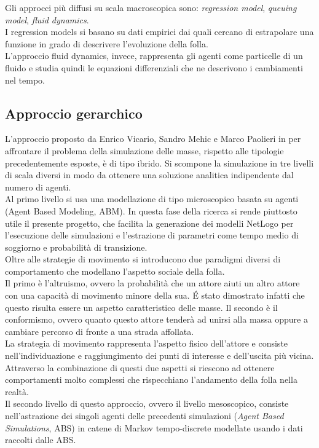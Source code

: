 Gli approcci più diffusi su scala macroscopica sono: \textit{regression model}, \textit{queuing model}, \textit{fluid dynamics}.\\
I regression models si basano su dati empirici dai quali cercano di estrapolare una funzione in grado di descrivere l'evoluzione della folla.\\
L'approccio fluid dynamics, invece, rappresenta gli agenti come particelle di un fluido e studia quindi le equazioni differenziali che ne descrivono i cambiamenti nel tempo.
\subsection{Approccio gerarchico}
\label{subsec:approccio-gerarchico}
L'approccio proposto da Enrico Vicario, Sandro Mehic e Marco Paolieri  in \cite{hierarchical-report} per affrontare il problema della simulazione delle masse, rispetto alle tipologie precedentemente esposte, è di tipo ibrido. Si scompone la simulazione in tre livelli di scala diversi in modo da ottenere una soluzione analitica indipendente dal numero di agenti.\\
Al primo livello si usa una modellazione di tipo microscopico basata su agenti (Agent Based Modeling, ABM). In questa fase della ricerca si rende piuttosto utile il presente progetto, che facilita la generazione dei modelli NetLogo per l'esecuzione delle simulazioni e l'estrazione di parametri come tempo medio di soggiorno e probabilità di transizione.\\
Oltre alle strategie di movimento si introducono due paradigmi diversi di comportamento che modellano l'aspetto sociale della folla.\\
Il primo è l'altruismo, ovvero la probabilità che un attore aiuti un altro attore con una capacità di movimento minore della sua. \'E stato dimostrato infatti che questo risulta essere un aspetto caratteristico delle masse. Il secondo è il conformismo, ovvero quanto questo attore tenderà ad unirsi alla massa oppure a cambiare percorso di fronte a una strada affollata.\\
La strategia di movimento rappresenta l'aspetto fisico dell'attore e consiste nell'individuazione e raggiungimento dei punti di interesse e dell'uscita più vicina.\\
Attraverso la combinazione di questi due aspetti si riescono ad ottenere comportamenti molto complessi che rispecchiano l'andamento della folla nella realtà.\\
Il secondo livello di questo approccio, ovvero il livello mesoscopico, consiste nell'astrazione dei singoli agenti delle precedenti simulazioni (\textit{Agent Based Simulations}, ABS) in catene di Markov tempo-discrete modellate usando i dati raccolti dalle ABS.\\
